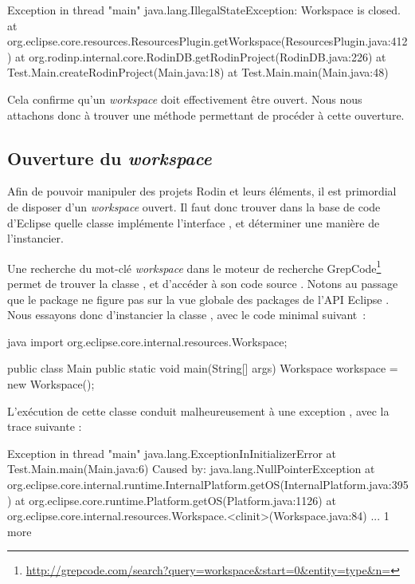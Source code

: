 \begin{imtaConsole}
Exception in thread "main" java.lang.IllegalStateException: Workspace is closed.
	at org.eclipse.core.resources.ResourcesPlugin.getWorkspace(ResourcesPlugin.java:412)
	at org.rodinp.internal.core.RodinDB.getRodinProject(RodinDB.java:226)
	at Test.Main.createRodinProject(Main.java:18)
	at Test.Main.main(Main.java:48)
\end{imtaConsole}

Cela confirme qu'un \textit{workspace} doit effectivement être ouvert.
Nous nous attachons donc à trouver une méthode permettant de procéder à cette ouverture.


\subsection{Ouverture du \textit{workspace}}

Afin de pouvoir manipuler des projets Rodin et leurs éléments, il est primordial de disposer d'un \textit{workspace} ouvert.
Il faut donc trouver dans la base de code d'Eclipse quelle classe implémente l'interface , et déterminer une manière de l'instancier.

Une recherche du mot-clé \textit{workspace} dans le moteur de recherche GrepCode\footnote{%
\url{http://grepcode.com/search?query=workspace&start=0&entity=type&n=}} %
permet de trouver la classe , et d'accéder à son code source \cite{eclipseworkspace}.
Notons au passage que le package  ne figure pas sur la vue globale des packages de l'API Eclipse \cite{eclipseapioverview}.
Nous essayons donc d'instancier la classe , avec le code minimal suivant~:

\begin{imtaCode}{java}
import org.eclipse.core.internal.resources.Workspace;    

public class Main {
    public static void main(String[] args) {
        Workspace workspace = new Workspace();
    }
}
\end{imtaCode}

L'exécution de cette classe conduit malheureusement à une exception , avec la trace suivante :

\begin{imtaConsole}
Exception in thread "main" java.lang.ExceptionInInitializerError
	at Test.Main.main(Main.java:6)
Caused by: java.lang.NullPointerException
	at org.eclipse.core.internal.runtime.InternalPlatform.getOS(InternalPlatform.java:395)
	at org.eclipse.core.runtime.Platform.getOS(Platform.java:1126)
	at org.eclipse.core.internal.resources.Workspace.<clinit>(Workspace.java:84)
	... 1 more
\end{imtaConsole}

